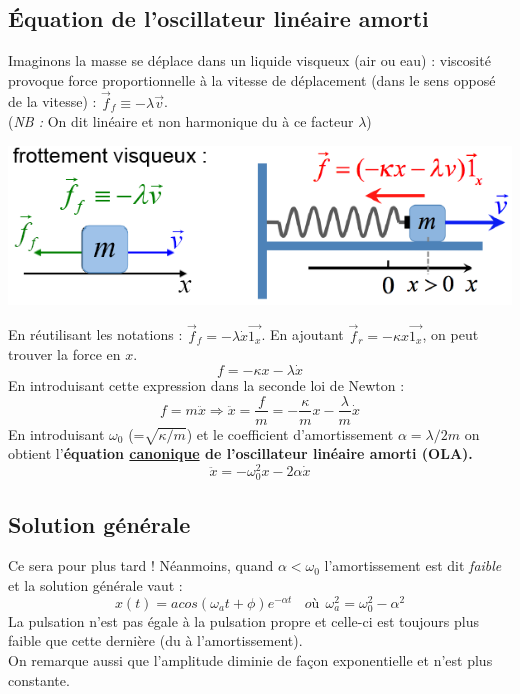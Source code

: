 \documentclass	[11pt, a4paper, openany]{book}
\begin{document}
	\subsection{Équation de l'oscillateur linéaire amorti}
	Imaginons la masse se déplace dans un liquide visqueux (air ou eau) : viscosité provoque force proportionnelle à la vitesse de déplacement (dans le sens opposé de la vitesse) : $\vec{f}_f \equiv -\lambda\vec{v}$.\\
	(\textit{NB :} On dit linéaire et non harmonique du à ce facteur $\lambda$)
	\begin{center}
		\includegraphics[scale=0.45]{oo/image7.png}
	\end{center}
	En réutilisant les notations : $\vec{f}_f = -\lambda\dot{x}\vec{1_x}$. En ajoutant $\vec{f}_r = -\kappa x \vec{1_x}$, on peut trouver la force en $x$.
	\begin{equation}
		f = -\kappa x - \lambda \dot{x}
	\end{equation}
	En introduisant cette expression dans la seconde loi de Newton : 
	\begin{equation}
		f = m\ddot{x} \Rightarrow \ddot{x} = \frac{f}{m} = -\frac{\kappa}{m}x - \frac{\lambda}{m}\dot{x}
	\end{equation}
	En introduisant $\omega_0$ (=$\sqrt{\kappa/m}$) et le coefficient d'amortissement $\alpha = \lambda/2m$ on obtient l'\textbf{équation \underline{canonique} de l'oscillateur linéaire amorti (OLA).}
	\begin{equation}
		\ddot{x} = - \omega_0^2x - 2\alpha\dot{x}
	\end{equation}
	
	\subsection{Solution générale}
	Ce sera pour plus tard ! Néanmoins, quand $\alpha < \omega_0$ l'amortissement est dit \textit{faible} et la solution générale vaut : 
	\begin{equation}
		x(t) = a cos(\omega_a t + \phi) e^{-\alpha t}\ \ \ \ où\ \ \omega_a^2 = \omega_0^2 - \alpha^2
	\end{equation}
	La pulsation n'est pas égale à la pulsation propre et celle-ci est toujours plus faible que cette dernière (du à l'amortissement).\\
	On remarque aussi que l'amplitude diminie de façon exponentielle et n'est plus constante.
	
\end{document}
